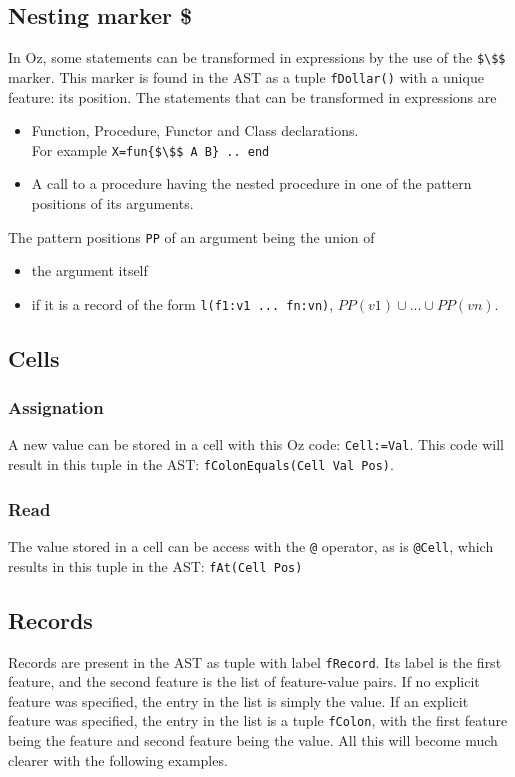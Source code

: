 \documentclass[a4paper]{memoir}
\begin{document}
\subsection{Nesting marker \$}\label{sec:input:nestingmarker}
In Oz, some statements can be transformed in expressions by the use of the
\lstinline[mathescape]!$\$$!
marker. This marker is found in the AST as a tuple \lstinline!fDollar()! with a unique
feature: its position.
The statements that can be transformed in expressions are
\begin{itemize}
  \item Function, Procedure, Functor and Class declarations. \\For example
    \lstinline[mathescape]!X=fun{$\$$ A B} .. end!
  \item A call to a procedure having the nested procedure in one of the pattern positions of its arguments.
\end{itemize}
The pattern positions \lstinline!PP! of an argument being the union of 
\begin{itemize}
  \item the argument itself
  \item if it is a record of the form \lstinline!l(f1:v1 ... fn:vn)!, $PP(v1) \cup ... \cup PP(vn)$.
\end{itemize}

\subsection{Cells}\label{sec:input:cells}
\subsubsection{Assignation}
A new value can be stored in a cell with this Oz code: \lstinline!Cell:=Val!. This code will result in 
this tuple in the AST: \lstinline!fColonEquals(Cell Val Pos)!. 
\subsubsection{Read}
The value stored in a cell can be access with the \lstinline!@! operator, as is
\lstinline!@Cell!, which results in this tuple in the AST: 
\lstinline!fAt(Cell Pos)!
\subsection{Records}\label{sec:input:records}

Records are present in the AST as tuple with label \lstinline!fRecord!. Its
label is the first feature, and the second feature is the list of feature-value
pairs. If no explicit feature was specified, the entry in the list is simply the value.
If an explicit feature was specified, the entry in the list is a tuple \lstinline!fColon!, with the
first feature being the feature and second feature being the value. All this
will become much clearer with the following examples.
\end{document}
